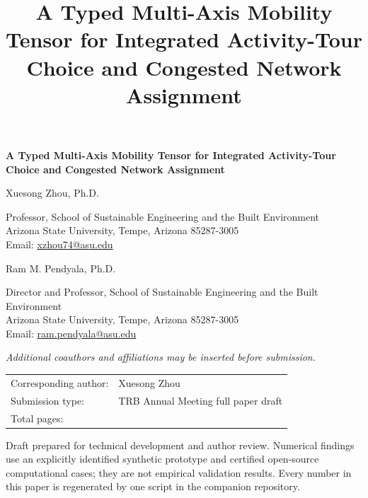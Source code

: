 \documentclass[10pt]{article}
\title{\textbf{A Typed Multi-Axis Mobility Tensor for Integrated Activity-Tour Choice and Congested Network Assignment}}
\author{}
\date{}
\begin{document}
\linenumbers

\begin{titlepage}
\thispagestyle{fancy}
\centering
\vspace*{0.35in}
{\Large\bfseries A Typed Multi-Axis Mobility Tensor for Integrated Activity-Tour Choice and Congested Network Assignment\par}
\vspace{0.45in}

{\large Xuesong Zhou, Ph.D.\par}
Professor, School of Sustainable Engineering and the Built Environment\\
Arizona State University, Tempe, Arizona 85287-3005\\
Email: \href{mailto:xzhou74@asu.edu}{xzhou74@asu.edu}\\
\vspace{0.25in}

{\large Ram M. Pendyala, Ph.D.\par}
Director and Professor, School of Sustainable Engineering and the Built Environment\\
Arizona State University, Tempe, Arizona 85287-3005\\
Email: \href{mailto:ram.pendyala@asu.edu}{ram.pendyala@asu.edu}\\
\vspace{0.25in}

\textit{Additional coauthors and affiliations may be inserted before submission.}

\vfill
\begin{tabular}{ll}
Corresponding author: & Xuesong Zhou\\
Submission type: & TRB Annual Meeting full paper draft\\
Total pages: & \pageref{LastPage}\\
\end{tabular}

\vspace{0.35in}
{\small Draft prepared for technical development and author review. Numerical findings use an explicitly identified synthetic prototype and certified open-source computational cases; they are not empirical validation results. Every number in this paper is regenerated by one script in the companion repository.}
\end{titlepage}
\setcounter{page}{2}
\end{document}

